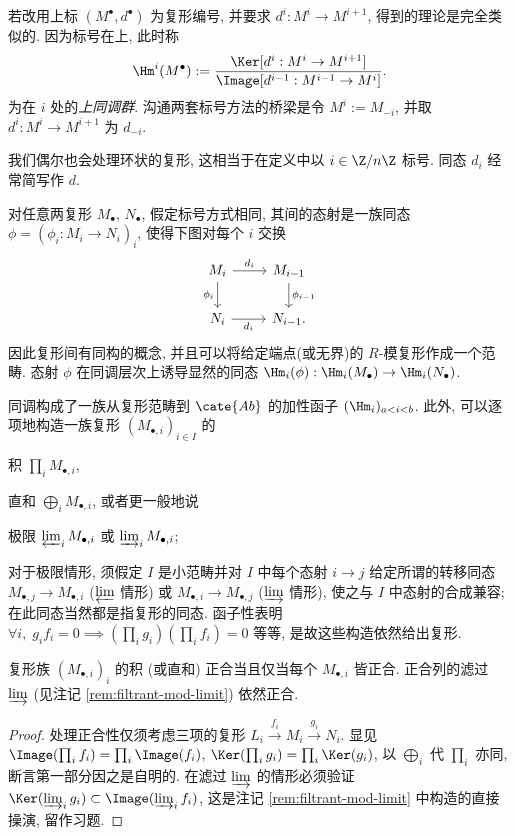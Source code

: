 若改用上标 $(M^\bullet, d^\bullet)$ 为复形编号, 并要求 $d^i: M^i \to M^{i+1}$, 得到的理论是完全类似的. 因为标号在上, 此时称 
\[ \Hm^i(M^\bullet) := \frac{\Ker[d^i: M^i \to M^{i+1}]}{\Image[d^{i-1}: M^{i-1} \to M^i]}. \]
为在 $i$ 处的\emph{上同调群}. 沟通两套标号方法的桥梁是令 $M^i := M_{-i}$, 并取 $d^i: M^i \to M^{i+1}$ 为 $d_{-i}$. 

我们偶尔也会处理环状的复形, 这相当于在定义中以 $i \in \Z/n\Z$ 标号. 同态 $d_i$ 经常简写作 $d$.
\begin{definition}
	对任意两复形 $M_\bullet$, $N_\bullet$, 假定标号方式相同, 其间的态射是一族同态 $\phi = (\phi_i: M_i \to N_i)_i$, 使得下图对每个 $i$ 交换
	\[ \begin{tikzcd}
	M_i \arrow[r, "d_i"] \arrow[d, "{\phi_i}"'] & M_{i-1} \arrow[d, "{\phi_{i-1}}"] \\
	N_i \arrow[r, "d_i"'] & N_{i-1}.
	\end{tikzcd}\]
	因此复形间有同构的概念, 并且可以将给定端点(或无界)的 $R$-模复形作成一个范畴. 态射 $\phi$ 在同调层次上诱导显然的同态 $\Hm_i(\phi): \Hm_i(M_\bullet) \to \Hm_i(N_\bullet)$.
\end{definition}
同调构成了一族从复形范畴到 $\cate{Ab}$ 的加性函子 $(\Hm_i)_{a<i<b}$. 此外, 可以逐项地构造一族复形 $(M_{\bullet,i})_{i \in I}$ 的
\begin{compactitem}
	\item 积 $\prod_i M_{\bullet,i}$,
	\item 直和 $\bigoplus_i M_{\bullet,i}$, 或者更一般地说
	\item 极限 $\varprojlim_i M_{\bullet,i}$ 或 $\varinjlim_i M_{\bullet,i}$;
\end{compactitem}
对于极限情形, 须假定 $I$ 是小范畴并对 $I$ 中每个态射 $i \to j$ 给定所谓的转移同态 $M_{\bullet,j} \to M_{\bullet,i}$ ($\varprojlim$ 情形) 或 $M_{\bullet,i} \to M_{\bullet,j}$ ($\varinjlim$ 情形), 使之与 $I$ 中态射的合成兼容; 在此同态当然都是指复形的同态. 函子性表明 $\forall i, \; g_i f_i = 0 \implies (\prod_i g_i) (\prod_i f_i)=0$ 等等, 是故这些构造依然给出复形.

\begin{lemma}\label{prop:mod-prod-exactness}
	复形族 $(M_{\bullet,i})_i$ 的积 (或直和) 正合当且仅当每个 $M_{\bullet,i}$ 皆正合. 正合列的滤过 $\varinjlim$ (见注记 \ref{rem:filtrant-mod-limit}) 依然正合.
\end{lemma}
\begin{proof}
	处理正合性仅须考虑三项的复形 $L_i \xrightarrow{f_i} M_i \xrightarrow{g_i} N_i$. 显见 $\Image(\prod_i f_i) = \prod_i \Image(f_i)$, $\Ker(\prod_i g_i) = \prod_i \Ker(g_i)$, 以 $\bigoplus_i$ 代 $\prod_i$ 亦同, 断言第一部分因之是自明的. 在滤过 $\varinjlim$ 的情形必须验证 $\Ker(\varinjlim_i g_i) \subset \Image(\varinjlim_i f_i)$, 这是注记 \ref{rem:filtrant-mod-limit} 中构造的直接操演, 留作习题.
\end{proof}

